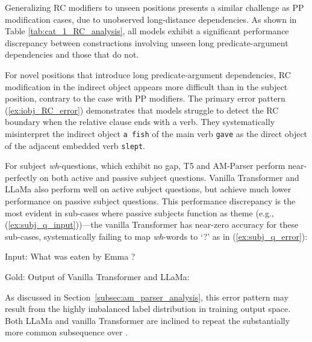 Generalizing RC modifiers to unseen positions presents a similar challenge as PP modification cases, due to unobserved long-distance dependencies. As shown in Table \ref{tab:cat_1_RC_analysis}, all models exhibit a significant performance discrepancy between constructions involving unseen long predicate-argument dependencies and those that do not.

For novel positions that introduce long predicate-argument dependencies, RC modification in the indirect object appears more difficult than in the subject position, contrary to the case with PP modifiers. The primary error pattern (\ref{ex:iobj_RC_error}) demonstrates that models struggle to detect the RC boundary when the relative clause ends with a verb. They systematically misinterpret the indirect object \texttt{a fish} of the main verb \texttt{gave} as the direct object of the adjacent embedded verb \texttt{slept}.  

 \label{app:subj_q}
For subject \emph{wh}-questions, which exhibit no gap, T5 and AM-Parser perform near-perfectly on both active and passive subject questions. Vanilla Transformer and LLaMa also perform well on active subject questions, but achieve much lower performance on passive subject questions. This performance discrepancy is the most evident in sub-cases where passive subjects function as theme (e.g., (\ref{ex:subj_q_input}))---the vanilla Transformer has near-zero accuracy for these sub-cases, systematically failing to map \emph{wh}-words to `?' as in (\ref{ex:subj_q_error}):  

\begin{exe}
\ex \label{ex:subj_q_input}Input: What was eaten by Emma ?
\begin{xlist}
    \ex \label{ex:subj_q_gold} Gold:  
    \ex \label{ex:subj_q_error} Output of Vanilla Transformer and LLaMa:  
\end{xlist}
\end{exe}

\noindent As discussed in Section~\ref{subsec:am_parser_analysis}, this error pattern may result from the highly imbalanced label distribution in training output space. Both LLaMa and vanilla Transformer are inclined to repeat the substantially more common subsequence  over . 

